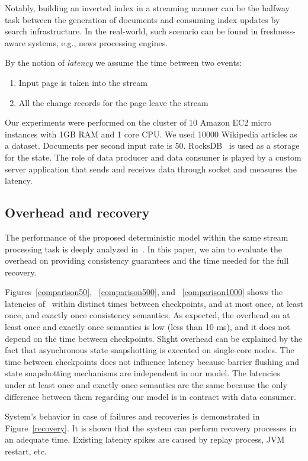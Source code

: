 Notably, building an inverted index in a streaming manner can be the halfway task between the generation of documents and consuming index updates by search infrastructure. In the real-world, such scenario can be found in freshness-aware systems, e.g., news processing engines.

By the notion of {\it latency} we assume the time between two events: 

\begin{enumerate}
    \item Input page is taken into the stream
    \item All the change records for the page leave the stream
\end{enumerate}

Our experiments were performed on the cluster of 10 Amazon EC2 micro instances with 1GB RAM and 1 core CPU. We used 10000 Wikipedia articles as a dataset. Documents per second input rate is 50. RocksDB~\cite{rocksdb} is used as a storage for the state. The role of data producer and data consumer is played by a custom server application that sends and receives data through socket and measures the latency.

\subsection{Overhead and recovery}
The performance of the proposed deterministic model within the same stream processing task is deeply analyzed in~\cite{hiddenSeim}. In this paper, we aim to evaluate the overhead on providing consistency guarantees and the time needed for the full recovery.

Figures~\ref{comparison50}, ~\ref{comparison500}, and ~\ref{comparison1000} shows the latencies of \FlameStream\ within distinct times between checkpoints, and at most once, at least once, and exactly once consistency semantics. As expected, the overhead on at least once and exactly once semantics is low (less than 10 ms), and it does not depend on the time between checkpoints. Slight overhead can be explained by the fact that asynchronous state snapshotting is executed on single-core nodes. The time between checkpoints does not influence latency because barrier flushing and state snapshotting mechanisms are independent in our model. The latencies under at least once and exactly once semantics are the same because the only difference between them regarding our model is in contract with data consumer.

System's behavior in case of failures and recoveries is demonstrated in Figure~\ref{recovery}. It is shown that the system can perform recovery processes in an adequate time. Existing latency spikes are caused by replay process, JVM restart, etc.

